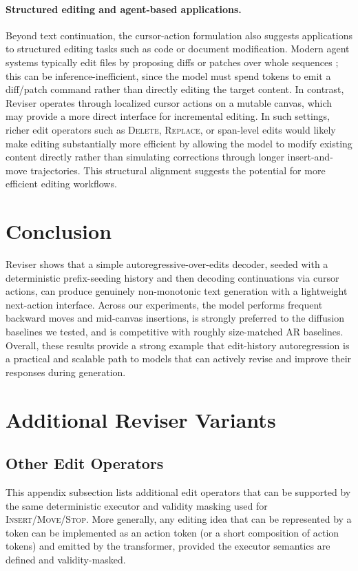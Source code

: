 \documentclass[11pt]{article}
\DeclareRobustCommand{\Stop}{\ifmmode\text{\textsc{Stop}}\else\textsc{Stop}\fi}
\DeclareRobustCommand{\Insert}{\ifmmode\text{\textsc{Insert}}\else\textsc{Insert}\fi}
\DeclareRobustCommand{\Move}{\ifmmode\text{\textsc{Move}}\else\textsc{Move}\fi}
\DeclareRobustCommand{\Delete}{\ifmmode\text{\textsc{Delete}}\else\textsc{Delete}\fi}
\DeclareRobustCommand{\Replace}{\ifmmode\text{\textsc{Replace}}\else\textsc{Replace}\fi}
\begin{document}
\paragraph{Structured editing and agent-based applications.}
Beyond text continuation, the cursor-action formulation also suggests applications to structured editing tasks such as code or document modification. Modern agent systems typically edit files by proposing diffs or patches over whole sequences \citep{yang2024sweagent,gauthier2024aider}; this can be inference-inefficient, since the model must spend tokens to emit a diff/patch command rather than directly editing the target content. In contrast, Reviser operates through localized cursor actions on a mutable canvas, which may provide a more direct interface for incremental editing. In such settings, richer edit operators such as \Delete, \Replace, or span-level edits would likely make editing substantially more efficient by allowing the model to modify existing content directly rather than simulating corrections through longer insert-and-move trajectories. This structural alignment suggests the potential for more efficient editing workflows.

\section{Conclusion}
\label{sec:conclusion}
Reviser shows that a simple autoregressive-over-edits decoder, seeded with a deterministic prefix-seeding history and then decoding continuations via cursor actions, can produce genuinely non-monotonic text generation with a lightweight next-action interface. Across our experiments, the model performs frequent backward moves and mid-canvas insertions, is strongly preferred to the diffusion baselines we tested, and is competitive with roughly size-matched AR baselines. Overall, these results provide a strong example that edit-history autoregression is a practical and scalable path to models that can actively revise and improve their responses during generation.




\appendix

\tableofcontents
\section{Additional Reviser Variants}

\subsection{Other Edit Operators}
\label{sec:optional_ops}
This appendix subsection lists additional edit operators that can be supported by the same deterministic executor and validity masking used for \Insert/\Move/\Stop.
More generally, any editing idea that can be represented by a token can be implemented as an action token (or a short composition of action tokens) and emitted by the transformer, provided the executor semantics are defined and validity-masked.
\end{document}
